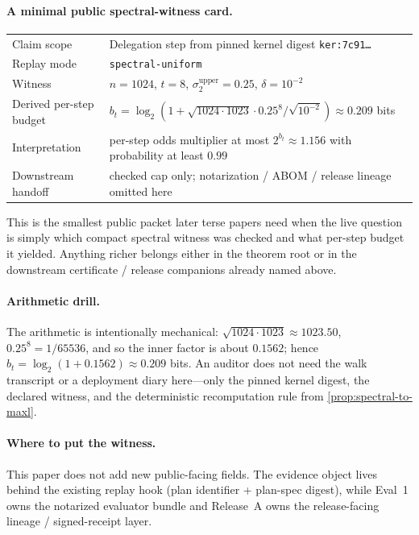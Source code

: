 \documentclass[11pt]{article}
\begin{document}
\paragraph{A minimal public spectral-witness card.}
\begin{center}\small
\begin{tabular}{@{}ll@{}}
Claim scope & Delegation step from pinned kernel digest \texttt{ker:7c91\ldots} \\
Replay mode & \texttt{spectral-uniform} \\
Witness & $n=1024$, $t=8$, $\sigma_2^{\mathrm{upper}}=0.25$, $\delta=10^{-2}$ \\
Derived per-step budget & $b_t=\log_2(1+\sqrt{1024\cdot 1023}\cdot 0.25^8/\sqrt{10^{-2}})\approx 0.209$ bits \\
Interpretation & per-step odds multiplier at most $2^{b_t}\approx 1.156$ with probability at least $0.99$ \\
Downstream handoff & checked cap only; notarization / ABOM / release lineage omitted here \\
\end{tabular}
\end{center}
This is the smallest public packet later terse papers need when the live question is simply which compact spectral witness was checked and what per-step budget it yielded. Anything richer belongs either in the theorem root or in the downstream certificate / release companions already named above.

\paragraph{Arithmetic drill.}
The arithmetic is intentionally mechanical: $\sqrt{1024\cdot 1023}\approx 1023.50$, $0.25^8=1/65536$, and so the inner factor is about $0.1562$; hence $b_t=\log_2(1+0.1562)\approx 0.209$ bits. An auditor does not need the walk transcript or a deployment diary here---only the pinned kernel digest, the declared witness, and the deterministic recomputation rule from \cref{prop:spectral-to-maxl}.

\paragraph{Where to put the witness.}
This paper does not add new public-facing fields.
The evidence object lives behind the existing replay hook (plan identifier + plan-spec digest), while Eval~1 owns the notarized evaluator bundle and Release~A owns the release-facing lineage / signed-receipt layer.\cite{series:auditorreplay,series:notcert,series:releaseA}
\end{document}
